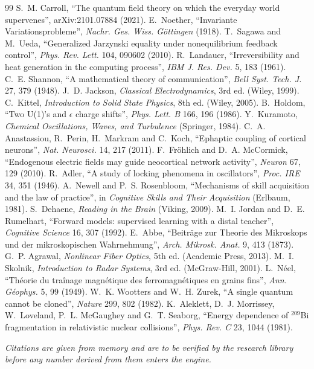 \documentclass[11pt,a4paper]{article}
\numberwithin{equation}{section}
\theoremstyle{definition}
\theoremstyle{plain}
\theoremstyle{remark}
\begin{document}
\begin{thebibliography}{99}\small
{} S.~M. Carroll, ``The quantum field theory on which the everyday world supervenes'', arXiv:2101.07884 (2021).
 E.~Noether, ``Invariante Variationsprobleme'', \emph{Nachr. Ges. Wiss. G\"ottingen} (1918).
 T.~Sagawa and M.~Ueda, ``Generalized Jarzynski equality under nonequilibrium feedback control'', \emph{Phys. Rev. Lett.} 104, 090602 (2010).
 R.~Landauer, ``Irreversibility and heat generation in the computing process'', \emph{IBM J. Res. Dev.} 5, 183 (1961).
 C.~E. Shannon, ``A mathematical theory of communication'', \emph{Bell Syst. Tech. J.} 27, 379 (1948).
 J.~D. Jackson, \emph{Classical Electrodynamics}, 3rd ed. (Wiley, 1999).
 C.~Kittel, \emph{Introduction to Solid State Physics}, 8th ed. (Wiley, 2005).
 B.~Holdom, ``Two U(1)'s and $\epsilon$ charge shifts'', \emph{Phys. Lett. B} 166, 196 (1986).
 Y.~Kuramoto, \emph{Chemical Oscillations, Waves, and Turbulence} (Springer, 1984).
 C.~A. Anastassiou, R.~Perin, H.~Markram and C.~Koch, ``Ephaptic coupling of cortical neurons'', \emph{Nat. Neurosci.} 14, 217 (2011).
 F.~Fr\"ohlich and D.~A. McCormick, ``Endogenous electric fields may guide neocortical network activity'', \emph{Neuron} 67, 129 (2010).
 R.~Adler, ``A study of locking phenomena in oscillators'', \emph{Proc. IRE} 34, 351 (1946).
 A.~Newell and P.~S. Rosenbloom, ``Mechanisms of skill acquisition and the law of practice'', in \emph{Cognitive Skills and Their Acquisition} (Erlbaum, 1981).
 S.~Dehaene, \emph{Reading in the Brain} (Viking, 2009).
 M.~I. Jordan and D.~E. Rumelhart, ``Forward models: supervised learning with a distal teacher'', \emph{Cognitive Science} 16, 307 (1992).
 E.~Abbe, ``Beitr\"age zur Theorie des Mikroskops und der mikroskopischen Wahrnehmung'', \emph{Arch. Mikrosk. Anat.} 9, 413 (1873).
 G.~P. Agrawal, \emph{Nonlinear Fiber Optics}, 5th ed. (Academic Press, 2013).
 M.~I. Skolnik, \emph{Introduction to Radar Systems}, 3rd ed. (McGraw-Hill, 2001).
 L.~N\'eel, ``Th\'eorie du tra\^inage magn\'etique des ferromagn\'etiques en grains fins'', \emph{Ann. G\'eophys.} 5, 99 (1949).
 W.~K. Wootters and W.~H. Zurek, ``A single quantum cannot be cloned'', \emph{Nature} 299, 802 (1982).
 K.~Aleklett, D.~J. Morrissey, W.~Loveland, P.~L. McGaughey and G.~T. Seaborg, ``Energy dependence of $^{209}$Bi fragmentation in relativistic nuclear collisions'', \emph{Phys. Rev. C} 23, 1044 (1981).
\end{thebibliography}
\noindent\textit{Citations are given from memory and are to be verified by the research library before any number derived from them enters the engine.}
\end{document}
